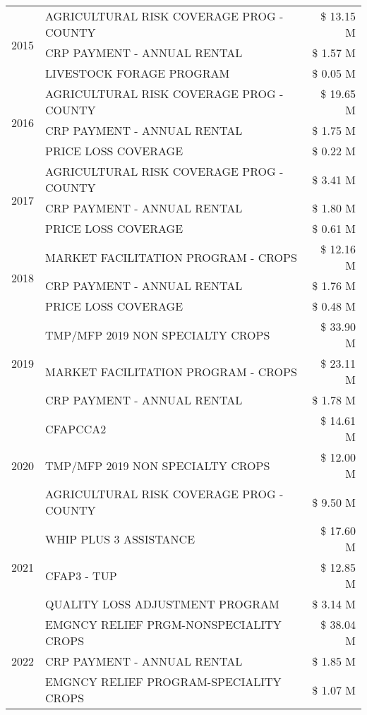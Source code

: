 \begin{tabular}{llr}
\cline{1-3}
\multirow[t]{3}{*}{2015} & AGRICULTURAL RISK COVERAGE PROG - COUNTY & \$ 13.15 M \\
 & CRP PAYMENT - ANNUAL RENTAL & \$ 1.57 M \\
 & LIVESTOCK FORAGE PROGRAM & \$ 0.05 M \\
\cline{1-3}
\multirow[t]{3}{*}{2016} & AGRICULTURAL RISK COVERAGE PROG - COUNTY & \$ 19.65 M \\
 & CRP PAYMENT - ANNUAL RENTAL & \$ 1.75 M \\
 & PRICE LOSS COVERAGE & \$ 0.22 M \\
\cline{1-3}
\multirow[t]{3}{*}{2017} & AGRICULTURAL RISK COVERAGE PROG - COUNTY & \$ 3.41 M \\
 & CRP PAYMENT - ANNUAL RENTAL & \$ 1.80 M \\
 & PRICE LOSS COVERAGE & \$ 0.61 M \\
\cline{1-3}
\multirow[t]{3}{*}{2018} & MARKET FACILITATION PROGRAM - CROPS & \$ 12.16 M \\
 & CRP PAYMENT - ANNUAL RENTAL & \$ 1.76 M \\
 & PRICE LOSS COVERAGE & \$ 0.48 M \\
\cline{1-3}
\multirow[t]{3}{*}{2019} & TMP/MFP 2019 NON SPECIALTY CROPS & \$ 33.90 M \\
 & MARKET FACILITATION PROGRAM - CROPS & \$ 23.11 M \\
 & CRP PAYMENT - ANNUAL RENTAL & \$ 1.78 M \\
\cline{1-3}
\multirow[t]{3}{*}{2020} & CFAPCCA2 & \$ 14.61 M \\
 & TMP/MFP 2019 NON SPECIALTY CROPS & \$ 12.00 M \\
 & AGRICULTURAL RISK COVERAGE PROG - COUNTY & \$ 9.50 M \\
\cline{1-3}
\multirow[t]{3}{*}{2021} & WHIP PLUS 3 ASSISTANCE & \$ 17.60 M \\
 & CFAP3 - TUP & \$ 12.85 M \\
 & QUALITY LOSS ADJUSTMENT PROGRAM & \$ 3.14 M \\
\cline{1-3}
\multirow[t]{3}{*}{2022} & EMGNCY RELIEF PRGM-NONSPECIALITY CROPS & \$ 38.04 M \\
 & CRP PAYMENT - ANNUAL RENTAL & \$ 1.85 M \\
 & EMGNCY RELIEF PROGRAM-SPECIALITY CROPS & \$ 1.07 M \\
\cline{1-3}
\bottomrule
\end{tabular}
